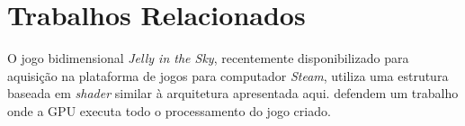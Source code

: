 \documentclass[conference]{IEEEtran}
\begin{document}
%





\section{Trabalhos Relacionados} \label{sec:relatedworks}

O jogo bidimensional \textit{Jelly in the Sky}, recentemente disponibilizado para aquisição na plataforma de jogos para computador \textit{Steam}, utiliza uma estrutura baseada em \textit{shader} similar à arquitetura apresentada aqui. \cite{GPGPUWars} defendem um trabalho onde a GPU executa todo o processamento do jogo criado.
\end{document}
